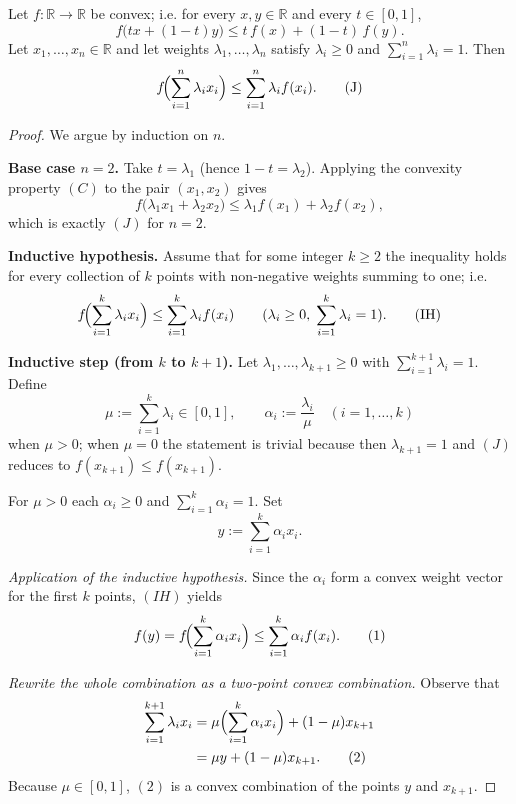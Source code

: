 \begin{theorem}
Let \(f:\mathbb R\to\mathbb R\) be convex; i.e. for every \(x,y\in\mathbb R\) and every \(t\in[0,1]\),
\[
f\bigl(t x+(1-t) y\bigr)\le t\,f(x)+(1-t)\,f(y). \tag{C}
\]
Let \(x_{1},\dots ,x_{n}\in\mathbb R\) and let weights \(\lambda_{1},\dots ,\lambda_{n}\) satisfy \(\lambda_{i}\ge0\) and \(\sum_{i=1}^{n}\lambda_{i}=1\).  
Then
\[
f\!\Bigl(\sum_{i=1}^{n}\lambda_{i}x_{i}\Bigr)\le\sum_{i=1}^{n}\lambda_{i}f(x_{i}). \tag{J}
\]
\end{theorem}

\begin{proof}
We argue by induction on \(n\).

\medskip\noindent\textbf{Base case \(n=2\).}  
Take \(t=\lambda_{1}\) (hence \(1-t=\lambda_{2}\)). Applying the convexity property \((C)\) to the pair \((x_{1},x_{2})\) gives
\[
f\bigl(\lambda_{1}x_{1}+\lambda_{2}x_{2}\bigr)
\le \lambda_{1}f(x_{1})+\lambda_{2}f(x_{2}),
\]
which is exactly \((J)\) for \(n=2\).

\medskip\noindent\textbf{Inductive hypothesis.}  
Assume that for some integer \(k\ge2\) the inequality holds for every collection of
\(k\) points with non‑negative weights summing to one; i.e.
\begin{align*}
f\!\Bigl(\sum_{i=1}^{k}\lambda_{i}x_{i}\Bigr)
\le \sum_{i=1}^{k}\lambda_{i}f(x_{i})
\qquad(\lambda_{i}\ge0,\;\sum_{i=1}^{k}\lambda_{i}=1). \tag{IH}
\end{align*}

\medskip\noindent\textbf{Inductive step (from \(k\) to \(k+1\)).}  
Let \(\lambda_{1},\dots ,\lambda_{k+1}\ge0\) with \(\sum_{i=1}^{k+1}\lambda_{i}=1\).  
Define
\[
\mu:=\sum_{i=1}^{k}\lambda_{i}\in[0,1],\qquad
\alpha_{i}:=\frac{\lambda_{i}}{\mu}\quad(i=1,\dots ,k)
\]
when \(\mu>0\); when \(\mu=0\) the statement is trivial because then \(\lambda_{k+1}=1\) and \((J)\) reduces to \(f(x_{k+1})\le f(x_{k+1})\).

For \(\mu>0\) each \(\alpha_{i}\ge0\) and \(\sum_{i=1}^{k}\alpha_{i}=1\).  Set
\[
y:=\sum_{i=1}^{k}\alpha_{i}x_{i}.
\]

\emph{Application of the inductive hypothesis.}  
Since the \(\alpha_{i}\) form a convex weight vector for the first \(k\) points, \((IH)\) yields
\begin{align}
f(y)=f\!\Bigl(\sum_{i=1}^{k}\alpha_{i}x_{i}\Bigr)
\le \sum_{i=1}^{k}\alpha_{i}f(x_{i}). \tag{1}
\end{align}

\emph{Rewrite the whole combination as a two‑point convex combination.}  
Observe that
\begin{align}
\sum_{i=1}^{k+1}\lambda_{i}x_{i}
&=\mu\Bigl(\sum_{i=1}^{k}\alpha_{i}x_{i}\Bigr)+(1-\mu)x_{k+1} \\
&=\mu y+(1-\mu)x_{k+1}. \tag{2}
\end{align}
Because \(\mu\in[0,1]\), \((2)\) is a convex combination of the points \(y\) and \(x_{k+1}\).


\end{proof}
